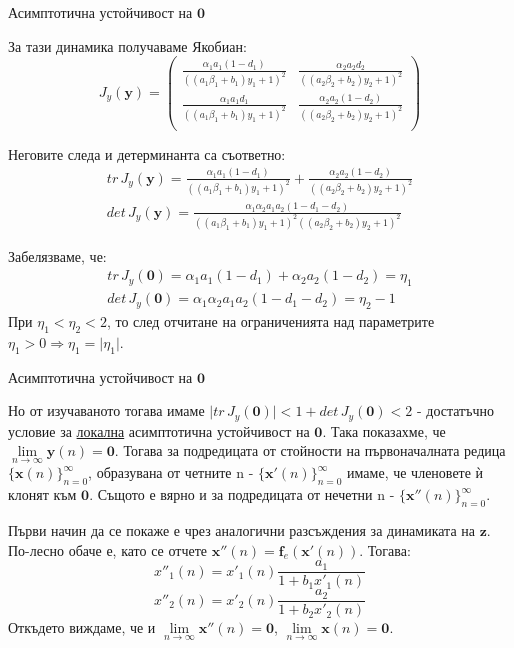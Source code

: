 \begin{frame}[t]{Асимптотична устойчивост на $\mathbf{0}$}

За тази динамика получаваме Якобиан:
\[J_{y}(\mathbf{y})=\left(
\begin{array}{cc}
 \frac{\alpha_{1} a_{1} (1-d_{1})}{((a_{1} \beta_{1} + b_{1}) y_{1} + 1)^2} & \frac{\alpha_{2} a_{2} d_{2}}{((a_{2} \beta_{2} + b_{2}) y_{2} + 1)^2}
 \\
 \frac{\alpha_{1} a_{1} d_{1}}{((a_{1} \beta_{1} + b_{1}) y_{1} + 1)^2} & \frac{\alpha_{2} a_{2} (1-d_{2})}{((a_{2} \beta_{2} + b_{2}) y_{2} + 1)^2}
 \\
\end{array}
\right)\]

Неговите следа и детерминанта са съответно:
\[\begin{array}{c}
tr \, J_{y}(\mathbf{y}) = \frac{\alpha_{1} a_{1} (1-d_{1})}{((a_{1} \beta_{1} + b_{1}) y_{1} + 1)^2} +  \frac{\alpha_{2} a_{2} (1-d_{2})}{((a_{2} \beta_{2} + b_{2}) y_{2} + 1)^2} \\
det \, J_{y}(\mathbf{y}) = \frac{\alpha_{1} \alpha_{2} a_{1} a_{2} (1 - d_{1} - d_{2})}
{((a_{1} \beta_{1} + b_{1}) y_{1} + 1)^2 ((a_{2} \beta_{2} + b_{2}) y_{2} + 1)^2}
\end{array}\]

Забелязваме, че:
\[\begin{array}{c}
tr \, J_{y}(\mathbf{0}) = \alpha_{1} a_{1} (1-d_{1}) + \alpha_{2} a_{2} (1-d_{2}) = \eta_{1} \\
det \, J_{y}(\mathbf{0}) = \alpha_{1} \alpha_{2} a_{1} a_{2} (1 - d_{1} - d_{2}) =\eta_{2} - 1
\end{array}\]
При $\eta_{1} < \eta_{2} < 2$, то след отчитане на ограниченията над параметрите $\eta_{1} > 0  \Rightarrow \eta_{1} = \lvert \eta_{1} \rvert$.

\end{frame}

\begin{frame}[t]{Асимптотична устойчивост на $\mathbf{0}$}

Но от изучаваното тогава имаме $\lvert tr \, J_{y}(\mathbf{0}) \rvert < 1 + det \, J_{y}(\mathbf{0}) < 2$ - достатъчно условие за \underline{локална} асимптотична устойчивост на $\mathbf{0}$. Така показахме, че $\lim\limits_{n \to \infty} \mathbf{y}(n) = \mathbf{0}$. Тогава за подредицата от стойности на първоначалната редица $\{\mathbf{x}(n)\}_{n=0}^{\infty}$, образувана от четните n  - $\{\mathbf{x}'(n)\}_{n=0}^{\infty}$ имаме, че членовете ѝ клонят към $\mathbf{0}$.
Същото е вярно и за подредицата от нечетни n - $\{\mathbf{x}''(n)\}_{n=0}^{\infty}$.

Първи начин да се покаже е чрез аналогични разсъждения за динамиката на $\mathbf{z}$. По-лесно обаче е, като се отчете $\mathbf{x}''(n)=\mathbf{f}_{e}(\mathbf{x}'(n))$. Тогава:
\[x''_{1}(n)=x'_{1}(n)\frac{a_{1}}{1+b_{1} x'_{1}(n)}\]
\[x''_{2}(n)=x'_{2}(n)\frac{a_{2}}{1+b_{2} x'_{2}(n)}\]
Откъдето виждаме, че и $\lim\limits_{n \to \infty}\mathbf{x''}(n) = \mathbf{0}$, $\lim\limits_{n \to \infty}\mathbf{x}(n) = \mathbf{0}$.

\end{frame}

